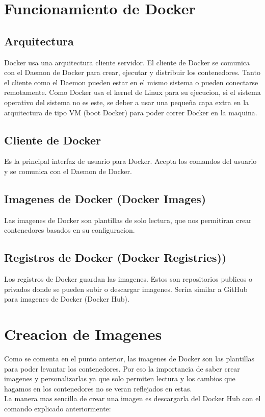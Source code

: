 \documentclass[preprint,12pt]{elsarticle}
\begin{document}

\section{Funcionamiento de Docker}

\subsection{Arquitectura}
Docker usa una arquitectura cliente servidor. El cliente de Docker se comunica con el Daemon de Docker para crear, ejecutar y distribuir los contenedores. 
Tanto el cliente como el Daemon pueden estar en el mismo sistema o pueden conectarse remotamente. 
Como Docker usa el kernel de Linux para su ejecucion, si el sistema operativo del sistema no es
este, se deber a usar una pequeña capa extra en la arquitectura de tipo VM (boot Docker) 
para poder correr Docker en la maquina.

\subsection{ Cliente de Docker}
Es la principal interfaz de usuario para Docker. Acepta los comandos del usuario y se comunica con el Daemon de Docker.

\subsection{ Imagenes de Docker (Docker Images)}
Las imagenes de Docker son plantillas de solo lectura, que nos permitiran crear contenedores basados en su configuracion.

\subsection{ Registros de Docker (Docker Registries))}
Los registros de Docker guardan las imagenes.  Estos son repositorios publicos o privados donde se pueden subir o descargar imagenes. Seríıa similar a GitHub para imagenes de Docker (Docker Hub).



\section{Creacion de Imagenes}
Como se comenta en el punto anterior, las imagenes de Docker son las plantillas para poder levantar los contenedores. Por eso la importancia de saber crear imagenes y personalizarlas ya que solo permiten lectura y los cambios que hagamos en los contenedores no se veran reflejados en  estas.
\\
La manera mas sencilla de crear una imagen es descargarla del Docker Hub con el comando explicado anteriormente:
\\
\end{document}
